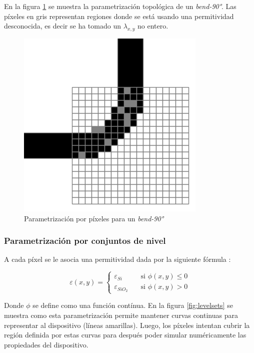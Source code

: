 En la figura \ref{fig:pixeles} se muestra la parametrización topológica de un \emph{bend-90°}. 
Las píxeles en gris representan regiones donde se está usando una permitividad desconocida, es decir se ha tomado un $\lambda_{x,y}$ no entero.

\begin{figure}[h]
  \centering
  \includegraphics[scale=0.8]{image/theory/parametrization-pixeles.png}
  \caption{Parametrización por píxeles para un \emph{bend-90°}}
  \label{fig:pixeles}
\end{figure}


\subsubsection{Parametrización por conjuntos de nivel}

A cada píxel se le asocia una permitividad dada por la siguiente fórmula \citep{Piggott2017}:

  \[ \varepsilon(x, y) =
    \begin{cases}
      \varepsilon_{Si}       & \quad \text{si } \phi(x, y) \leq 0\\
      \varepsilon_{SiO_2}    & \quad \text{si } \phi(x, y) > 0
    \end{cases}
  \]

Donde $\phi$ se define como una función contínua. 
En la figura \ref{fig:levelsets} se muestra como esta parametrización permite mantener curvas continuas para representar al dispositivo (líneas amarillas).
Luego, los píxeles intentan cubrir la región definida por estas curvas para después poder simular numéricamente las propiedades del dispositivo.

